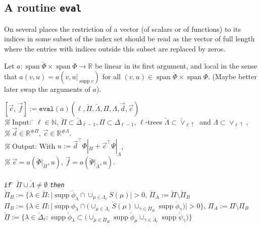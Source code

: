 \documentclass{amsart}
\theoremstyle{definition}
\theoremstyle{remark}
\numberwithin{equation}{section}
\newcommand{\R}{\mathbb R}
\newcommand{\N}{\mathbb N}
\DeclareMathOperator{\supp}{supp}
\DeclareMathOperator{\Span}{span}
\newcommand{\1}{\mathbb 1}
\begin{document}
\subsection{A routine \texttt{eval}} \label{Seval}
On several places the restriction of a vector (of scalars or of functions) to its indices in some subset of the index set should be read as the vector of full length where the entries with indices outside this subset are replaced by zeros.

Let $a\colon \Span \breve{\Phi} \times \Span \Phi \rightarrow \R$ be linear in its first argument, and local in the sense that $a(v,u)=a(v,u|_{\supp v})$ for all $(v,u) \in \Span \breve{\Phi} \times \Span \Phi$.
(Maybe better later swap the arguments of $a$).\medskip

{\em \begin{tabbing}
$[\vec{e},\,\vec{f}]:=\mathtt{eval}(a)(\ell,  \breve{\Pi},\breve{\Lambda},\Pi,\Lambda,\vec{d},\vec{c})$\\
%
{\em \%} Input: \= $\ell \in \N$,
$\breve{\Pi} \subset \breve{\Delta}_{\ell-1}, \Pi \subset \Delta_{\ell-1}$, 
$\ell$-trees $\breve{\Lambda} \subset \breve{\vee}_{\ell\uparrow}$ and $\Lambda \subset {\vee}_{\ell\uparrow}$,\\
{\em \%} \> $\vec{d}\in \R^{\# \Pi},\, \vec{c}\in  \R^{\#  \Lambda}$. \\
%
{\em \%} Output: With $u:=\vec{d}^\top \Phi|_{\Pi}+\vec{c}^\top \Psi|_{\Lambda}$,\\
{\em \%} \> $\vec{e}=a(\breve{\Phi}|_{\breve{\Pi}},u)$,
$\vec{f}=a(\breve{\Psi}|_{\breve{\Lambda}},u)$.\\ \\
%
%
{\em \texttt{if}} \= $\breve{\Pi}\cup \breve{\Lambda}\neq \emptyset$ {\em \texttt{then}} \\
%
%
\>$\breve{\Pi}_B:=\{\lambda \in \breve{\Pi}\colon \big|\supp \breve{\phi}_\lambda \cap \cup_{\mu \in \Lambda_\ell}S(\mu)\big|>0$, $\breve{\Pi}_A:=\breve{\Pi} \setminus \breve{\Pi}_B$\\
\>$\Pi_B:=\{\lambda \in \Pi\colon \big|\supp \phi_\lambda \cap \big(\cup_{\mu \in \breve{\Lambda}_\ell} \breve{S}(\mu) \cup_{\gamma \in \breve{\Pi}_B} \supp \breve{\phi}_\gamma \big)\big|>0\}$, $\Pi_A:=\Pi \setminus \Pi_B$\\
\>$\breve{\underline{\Pi}}:=\{\lambda \in \breve{\Delta}_{\ell}\colon \supp \breve{\phi}_\lambda \subset \big(\cup_{\mu \in \breve{\Pi}_B} \supp \breve{\phi}_\mu \cup_{\gamma \in \breve{\Lambda}_\ell} \supp\breve{\psi}_\gamma\big)\}$\\

\end{tabbing}}
\end{document}
